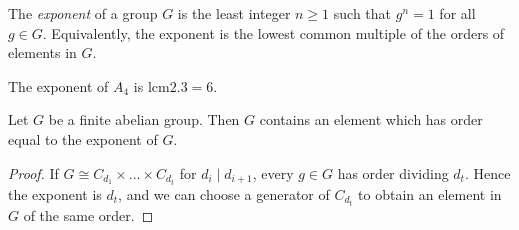 \begin{definition}
	The \textit{exponent} of a group \( G \) is the least integer \( n \geq 1 \) such that \( g^n = 1 \) for all \( g \in G \).
	Equivalently, the exponent is the lowest common multiple of the orders of elements in \( G \).
\end{definition}
\begin{example}
	The exponent of \( A_4 \) is \( \mathrm{lcm}\qty{2, 3} = 6 \).
\end{example}
\begin{corollary}
	Let \( G \) be a finite abelian group.
	Then \( G \) contains an element which has order equal to the exponent of \( G \).
\end{corollary}
\begin{proof}
	If \( G \cong C_{d_1} \times \dots \times C_{d_t} \) for \( d_i \mid d_{i+1} \), every \( g \in G \) has order dividing \( d_t \).
	Hence the exponent is \( d_t \), and we can choose a generator of \( C_{d_t} \) to obtain an element in \( G \) of the same order.
\end{proof}
